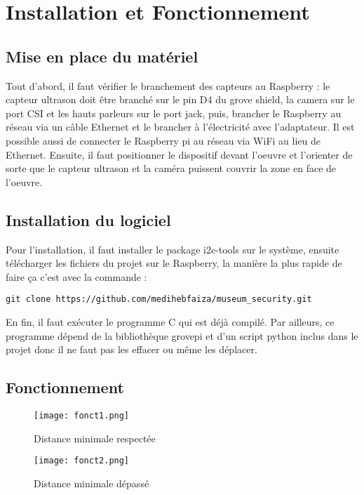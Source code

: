 \section{Installation et Fonctionnement}

    \subsection{Mise en place du matériel}
        Tout d'abord, il faut vérifier le branchement des capteurs au Raspberry : le capteur ultrason doit être branché sur le pin D4 du grove shield, la camera sur le port CSI et les hauts parleurs sur le port jack, puis, brancher le Raspberry au réseau via un câble Ethernet et le brancher à l'électricité avec l'adaptateur. Il est possible aussi de connecter le Raspberry pi au réseau via WiFi au lieu de Ethernet.
        Ensuite, il faut positionner le dispositif devant l'oeuvre et l'orienter de sorte que le capteur ultrason et la caméra puissent couvrir la zone en face de l'oeuvre.
    
    \subsection{Installation du logiciel}
        Pour l'installation, il faut installer le package i2c-tools sur le système, ensuite télécharger les fichiers du projet sur le Raspberry, la manière la plus rapide de faire ça c'est avec la commande :
        \begin{verbatim}git clone https://github.com/medihebfaiza/museum_security.git \end{verbatim}
        En fin, il faut exécuter le programme C qui est déjà compilé.
        Par ailleurs, ce programme dépend de la bibliothèque grovepi et d'un script python inclus dans le projet donc il ne faut pas les effacer ou même les déplacer.
    
    \subsection{Fonctionnement}
    
    \begin{figure}[h]
        \centering
        \texttt{[image: fonct1.png]}
        \caption{Distance minimale respectée}
        \label{fig:fonct1}
    \end{figure}
            
    \begin{figure}[h]
        \centering
        \texttt{[image: fonct2.png]}
        \caption{Distance minimale dépassé}
        \label{fig:fonct2}
    \end{figure}
            
